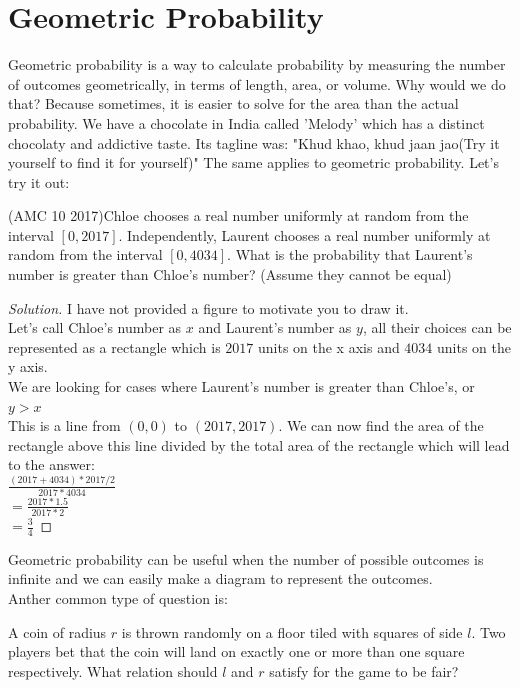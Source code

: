 \section{Geometric Probability}
Geometric probability is a way to calculate probability by measuring the number of outcomes geometrically, in terms of length, area, or volume. Why would we do that? Because sometimes, it is easier to solve for the area than the actual probability. We have a chocolate in India called 'Melody' which has a distinct chocolaty and addictive taste. Its tagline was: "Khud khao, khud jaan jao(Try it yourself to find it for yourself)" The same applies to geometric probability. Let's try it out: \\
\begin{example}
    (AMC 10 2017)Chloe chooses a real number uniformly at random from the interval $[0, 2017]$. Independently, Laurent chooses a real number uniformly at random from the interval $[0, 4034]$. What is the probability that Laurent’s number is greater than Chloe’s number? (Assume they cannot be equal)
\end{example}
\begin{proof}
    [Solution]
    I have not provided a figure to motivate you to draw it.\\
    Let's call Chloe's number as $x$ and Laurent's number as $y$, all their choices can be represented as a rectangle which is $2017$ units on the x axis and $4034$ units on the y axis. \\
    We are looking for cases where Laurent's number is greater than Chloe's, or $y>x$\\
    This is a line from $(0,0)$ to $(2017,2017)$. We can now find the area of the rectangle above this line divided by the total area of the rectangle which will lead to the answer:\\
    $\frac{(2017+4034)*2017/2}{2017*4034}$\\
    $=\frac{2017*1.5}{2017*2}$\\
    $=\frac{3}{4}$
\end{proof}
Geometric probability can be useful when the number of possible outcomes is infinite and we can easily make a diagram to represent the outcomes.\\
Anther common type of question is:\\
\begin{example}
    A coin of radius $r$ is thrown randomly on a floor tiled with squares of side $l$. Two players bet that the coin will land on exactly one or more than one square respectively. What relation should $l$ and $r$ satisfy for the game to be fair? 
\end{example}
